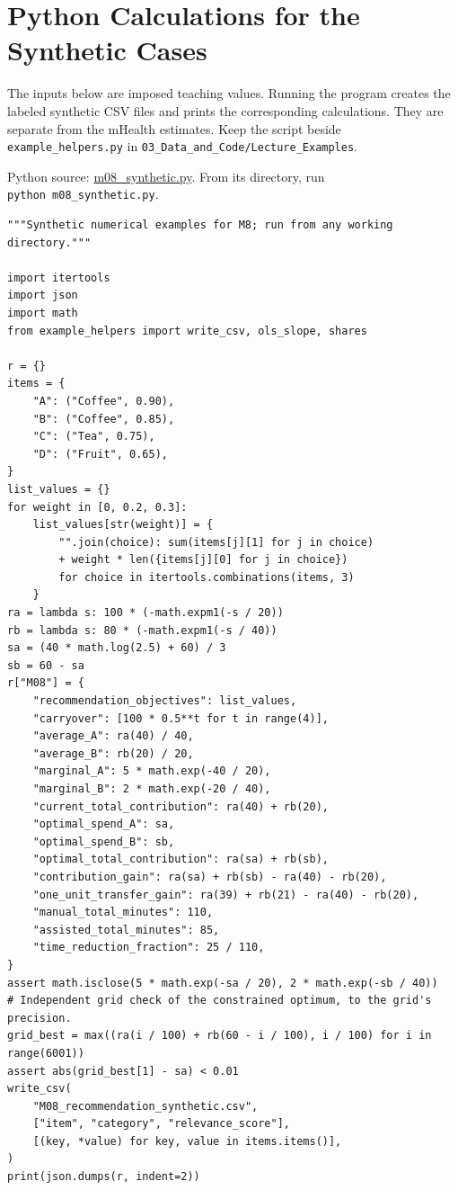\hypertarget{M08-python-calculations-for-the-synthetic-cases}{%
\section{Python Calculations for the Synthetic
Cases}\label{M08-python-calculations-for-the-synthetic-cases}}

\noindent The inputs below are imposed teaching values. Running the program
creates the labeled synthetic CSV files and prints the corresponding
calculations. They are separate from the mHealth estimates. Keep the
script beside \texttt{example\_helpers.py} in
\texttt{03\_Data\_and\_Code/Lecture\_Examples}.

\FloatBarrier
{}
Python source:
\href{../03_Data_and_Code/Lecture_Examples/m08_synthetic.py}{m08\_synthetic.py}.
From its directory, run \texttt{python\ m08\_synthetic.py}.

\begin{Verbatim}[breaklines,breakanywhere,fontsize=\small]
"""Synthetic numerical examples for M8; run from any working directory."""

import itertools
import json
import math
from example_helpers import write_csv, ols_slope, shares

r = {}
items = {
    "A": ("Coffee", 0.90),
    "B": ("Coffee", 0.85),
    "C": ("Tea", 0.75),
    "D": ("Fruit", 0.65),
}
list_values = {}
for weight in [0, 0.2, 0.3]:
    list_values[str(weight)] = {
        "".join(choice): sum(items[j][1] for j in choice)
        + weight * len({items[j][0] for j in choice})
        for choice in itertools.combinations(items, 3)
    }
ra = lambda s: 100 * (-math.expm1(-s / 20))
rb = lambda s: 80 * (-math.expm1(-s / 40))
sa = (40 * math.log(2.5) + 60) / 3
sb = 60 - sa
r["M08"] = {
    "recommendation_objectives": list_values,
    "carryover": [100 * 0.5**t for t in range(4)],
    "average_A": ra(40) / 40,
    "average_B": rb(20) / 20,
    "marginal_A": 5 * math.exp(-40 / 20),
    "marginal_B": 2 * math.exp(-20 / 40),
    "current_total_contribution": ra(40) + rb(20),
    "optimal_spend_A": sa,
    "optimal_spend_B": sb,
    "optimal_total_contribution": ra(sa) + rb(sb),
    "contribution_gain": ra(sa) + rb(sb) - ra(40) - rb(20),
    "one_unit_transfer_gain": ra(39) + rb(21) - ra(40) - rb(20),
    "manual_total_minutes": 110,
    "assisted_total_minutes": 85,
    "time_reduction_fraction": 25 / 110,
}
assert math.isclose(5 * math.exp(-sa / 20), 2 * math.exp(-sb / 40))
# Independent grid check of the constrained optimum, to the grid's precision.
grid_best = max((ra(i / 100) + rb(60 - i / 100), i / 100) for i in range(6001))
assert abs(grid_best[1] - sa) < 0.01
write_csv(
    "M08_recommendation_synthetic.csv",
    ["item", "category", "relevance_score"],
    [(key, *value) for key, value in items.items()],
)
print(json.dumps(r, indent=2))
\end{Verbatim}


